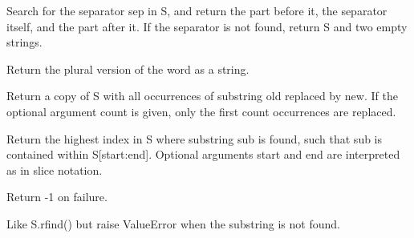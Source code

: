 \documentclass[letterpaper,10pt,english]{sphinxmanual}
\begin{document}
\begin{fulllineitems}

\begin{fulllineitems}
\label{api_reference:textblob_de.blob.Word.partition}
Search for the separator sep in S, and return the part before it,
the separator itself, and the part after it.  If the separator is not
found, return S and two empty strings.

\end{fulllineitems}


\begin{fulllineitems}
\label{api_reference:textblob_de.blob.Word.pluralize}
Return the plural version of the word as a string.

\end{fulllineitems}


\begin{fulllineitems}
\label{api_reference:textblob_de.blob.Word.replace}
Return a copy of S with all occurrences of substring
old replaced by new.  If the optional argument count is
given, only the first count occurrences are replaced.

\end{fulllineitems}


\begin{fulllineitems}
\label{api_reference:textblob_de.blob.Word.rfind}
Return the highest index in S where substring sub is found,
such that sub is contained within S{[}start:end{]}.  Optional
arguments start and end are interpreted as in slice notation.

Return -1 on failure.

\end{fulllineitems}


\begin{fulllineitems}
\label{api_reference:textblob_de.blob.Word.rindex}
Like S.rfind() but raise ValueError when the substring is not found.


\end{fulllineitems}
\end{fulllineitems}
\end{document}
